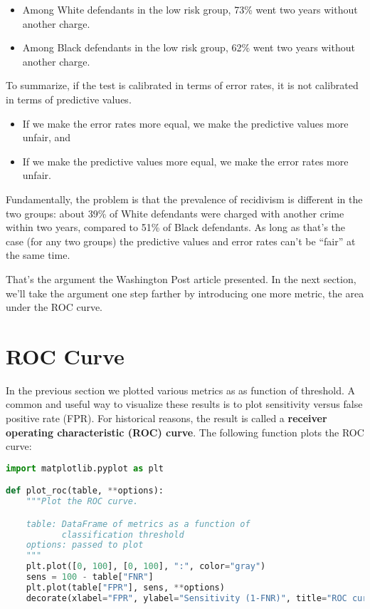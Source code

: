 \begin{itemize}
\item
  Among White defendants in the low risk group, 73\% went two years
  without another charge.
\item
  Among Black defendants in the low risk group, 62\% went two years
  without another charge.
\end{itemize}

To summarize, if the test is calibrated in terms of error rates, it is
not calibrated in terms of predictive values.

\begin{itemize}
\item
  If we make the error rates more equal, we make the predictive values
  more unfair, and
\item
  If we make the predictive values more equal, we make the error rates
  more unfair.
\end{itemize}

Fundamentally, the problem is that the prevalence of recidivism is
different in the two groups: about 39\% of White defendants were charged
with another crime within two years, compared to 51\% of Black
defendants. As long as that's the case (for any two groups) the
predictive values and error rates can't be ``fair'' at the same time.

That's the argument the Washington Post article presented. In the next
section, we'll take the argument one step farther by introducing one
more metric, the area under the ROC curve.

\section{ROC Curve}\label{roc-curve}

In the previous section we plotted various metrics as as function of
threshold. A common and useful way to visualize these results is to plot
sensitivity versus false positive rate (FPR). For historical reasons,
the result is called a \textbf{receiver operating characteristic (ROC)
curve}. The following function plots the ROC curve:

\begin{lstlisting}[language=Python,style=source]
import matplotlib.pyplot as plt

def plot_roc(table, **options):
    """Plot the ROC curve.

    table: DataFrame of metrics as a function of
           classification threshold
    options: passed to plot
    """
    plt.plot([0, 100], [0, 100], ":", color="gray")
    sens = 100 - table["FNR"]
    plt.plot(table["FPR"], sens, **options)
    decorate(xlabel="FPR", ylabel="Sensitivity (1-FNR)", title="ROC curve")
\end{lstlisting}

